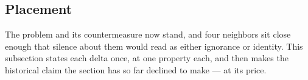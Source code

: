 \documentclass[11pt]{article}
\numberwithin{equation}{section}
\theoremstyle{plain}
\theoremstyle{definition}
\theoremstyle{remark}
\begin{document}
%

\subsection{Placement}\label{ac:sub:placement}

The problem and its countermeasure now stand, and four neighbors sit close enough that silence about them would read as either ignorance or identity. This subsection states each delta once, at one property each, and then makes the historical claim the section has so far declined to make --- at its price.
\end{document}
